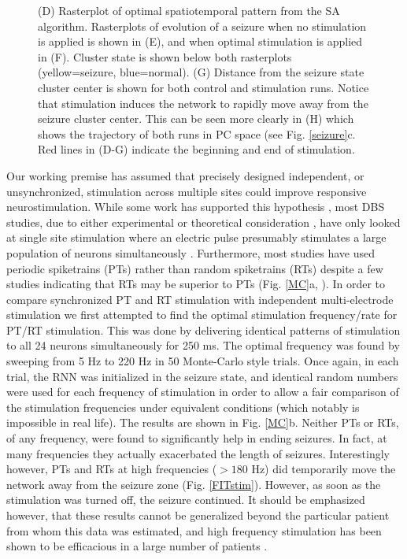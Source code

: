 \documentclass[journal,twoside,web]{ieeecolor}
\newcommand{\nn}{24}    %
\newcommand{\len}{250}   %
\begin{document}
\begin{figure}[!ht]
{		(D) Rasterplot of optimal spatiotemporal pattern from the SA algorithm.
		Rasterplots of evolution of a seizure when no stimulation is applied is shown in (E), and when optimal stimulation is applied in (F). Cluster state is shown below both rasterplots (yellow=seizure, blue=normal).
		(G) Distance from the seizure state cluster center is shown for both control and stimulation runs. Notice that stimulation induces the network to rapidly move away from the seizure cluster center. This can be seen more clearly in (H) which shows the trajectory of both runs in PC space (see Fig. \ref{seizure}c.
		Red lines in (D-G) indicate the beginning and end of stimulation.}
	\label{SAresults}
\end{figure}

Our working premise has assumed that precisely designed independent, or unsynchronized, stimulation across multiple sites could improve responsive neurostimulation.
While some work has supported this hypothesis \cite{nelson11}, most DBS studies, due to either experimental or theoretical consideration \cite{durand01}, have only looked at single site stimulation where an electric pulse presumably stimulates a large population of neurons simultaneously \cite{sun14}.
Furthermore, most studies have used periodic spiketrains (PTs) rather than random spiketrains (RTs) despite a few studies indicating that RTs may be superior to PTs (Fig. \ref{MC}a, \cite{wyckhuys10,van14}).
In order to compare synchronized PT and RT stimulation with independent multi-electrode stimulation we first attempted to find the optimal stimulation frequency/rate for PT/RT stimulation.
This was done by delivering identical patterns of stimulation to all \nn{} neurons simultaneously for \len{} ms.
The optimal frequency was found by sweeping from 5 Hz to 220 Hz in 50 Monte-Carlo style trials.
Once again, in each trial, the RNN was initialized in the seizure state, and identical random numbers were used for each frequency of stimulation in order to allow a fair comparison of the stimulation frequencies under equivalent conditions (which notably is impossible in real life).
The results are shown in Fig. \ref{MC}b.
Neither PTs or RTs, of any frequency, were found to significantly help in ending seizures.
In fact, at many frequencies they actually exacerbated the length of seizures.
Interestingly however, PTs and RTs at high frequencies ($>180$ Hz) did temporarily move the network away from the seizure zone (Fig. \ref{FITstim}).
However, as soon as the stimulation was turned off, the seizure continued.
It should be emphasized however, that these results cannot be generalized beyond the particular patient from whom this data was estimated, and high frequency stimulation has been shown to be efficacious in a large number of patients \cite{heck14}.
\end{document}

